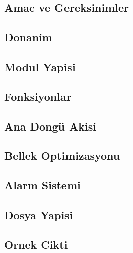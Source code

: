 \documentclass[9pt]{beamer}
\begin{document}
\Front
\overview
\subsection{Amac ve Gereksinimler}

\subsection{Donanim}

\subsection{Modul Yapisi}

\subsection{Fonksiyonlar}

\subsection{Ana Dongü Akisi}

\subsection{Bellek Optimizasyonu}

\subsection{Alarm Sistemi}

\subsection{Dosya Yapisi}

\subsection{Ornek Cikti}

\pagestyle{empty}
\end{document}

